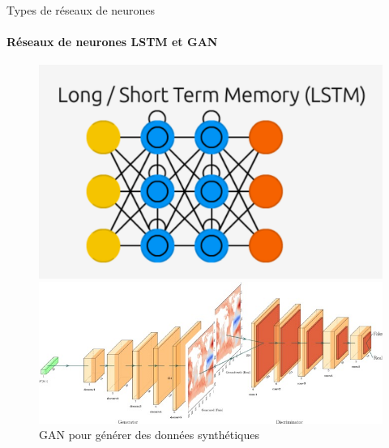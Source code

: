 \documentclass{beamer}
\begin{document}
\begin{frame}{Types de réseaux de neurones}
	\framesubtitle{Réseaux de neurones LSTM et GAN}
	\begin{figure}[h]
		\centering
		\begin{minipage}{0.5\textwidth}
			\centering
			\includegraphics[width=\linewidth]{ls.png}
			\caption{RNN avec capacité de mémorisation à long terme}
		\end{minipage}\hfill
		\begin{minipage}{0.5\textwidth}
			\centering
			\includegraphics[width=\linewidth]{gan.jpg}
			\caption{GAN pour générer des données synthétiques}
		\end{minipage}
	\end{figure}
\end{frame}
\end{document}
